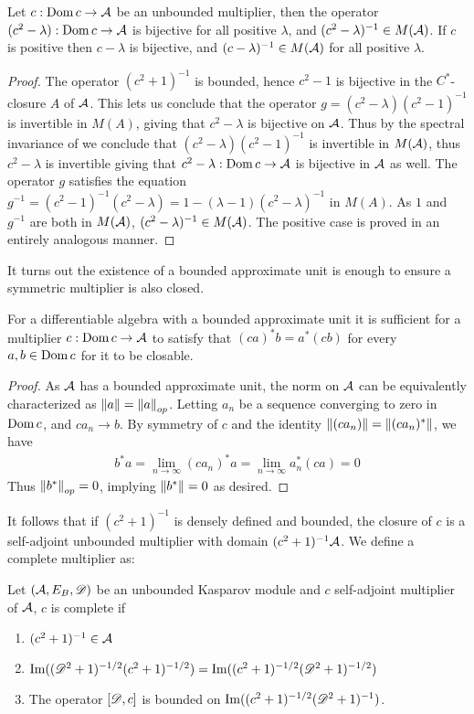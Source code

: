 \begin{lemma}
	Let $c:\operatorname{Dom} c\to \mathcal{A}$ be an unbounded multiplier, then the operator $(c^2-\lambda):\operatorname{Dom} c \to \mathcal{A}$ is bijective for all positive $\lambda$, and $(c^2-\lambda)^{-1}\in M(\mathcal{A})$. If $c$ is positive then $c-\lambda$ is bijective, and $(c-\lambda)^{-1}\in M(\mathcal{A})$ for all positive $\lambda$.
\end{lemma}
\begin{proof}
	The operator $(c^2+1)^{-1}$ is bounded, hence $c^2-1$ is bijective in the $C^*$-closure $A$ of $\mathcal{A}$. This lets us conclude that the operator $g=(c^2-\lambda)(c^2-1)^{-1}$ is invertible in $M(A)$, giving that $c^2-\lambda$ is bijective on $\mathcal{A}$. Thus by the spectral invariance of  we conclude that $(c^2-\lambda)(c^2-1)^{-1}$ is invertible in $M(\mathcal{A})$, thus $c^2-\lambda$ is invertible giving that $c^2-\lambda:\operatorname{Dom} c\to \mathcal{A}$ is bijective in $\mathcal{A}$ as well.
	The operator $g$ satisfies the equation $g^{-1}=(c^2-1)^{-1}(c^2-\lambda)=1-(\lambda -1)(c^2-\lambda)^{-1}$ in $M(A)$. As $1$ and $g^{-1}$ are both in $M(\mathcal{A})$, $(c^2-\lambda)^{-1}\in M(\mathcal{A})$. 
	The positive case is proved in an entirely analogous manner. 
\end{proof}
It turns out the existence of a bounded approximate unit is enough to ensure a symmetric multiplier is also closed. 
\begin{lemma}
	For a differentiable algebra with a bounded approximate unit it is sufficient for a multiplier $c:\operatorname{Dom} c \to \mathcal{A}$ to satisfy that $(ca)^*b=a^*(cb)$ for every $a,b\in \operatorname{Dom} c$ for it to be closable. 
\end{lemma}
\begin{proof}
	As $\mathcal{A}$ has a bounded approximate unit, the norm on $\mathcal{A}$ can be equivalently characterized as $\left \Vert a \right \Vert=\left \Vert a \right \Vert_{op}$. Letting $a_n$ be a sequence converging to zero in $\operatorname{Dom} c$, and $ca_n\to b$. By symmetry of $c$ and the identity $\left \Vert (ca_n) \right \Vert=\left \Vert (ca_n)^* \right \Vert$, we have 
	\begin{align*}
		b^*a=\lim_{n\to \infty} (ca_n)^* a=\lim_{n\to \infty} a^*_n(ca)=0
	\end{align*}
	Thus $\left \Vert b^* \right \Vert_{op}=0$, implying $\left \Vert b^* \right \Vert=0$ as desired. 
\end{proof}
It follows that if $(c^2+1)^{-1}$ is densely defined and bounded, the closure of $c$ is a self-adjoint unbounded multiplier with domain $(c^2+1)^{-1}\mathcal{A}$. We define a complete multiplier as: 
\begin{definition}
	Let $(\mathcal{A},E_B,\mathscr{D})$ be an unbounded Kasparov module and $c$ self-adjoint multiplier of $\mathcal{A}$, $c$ is complete if 
\begin{enumerate}
\item 
	$	(c^2+1)^{-1}\in \mathcal{A}$ 
\item
		$\operatorname{Im}((\mathscr{D}^2+1)^{-1/2}(c^2+1)^{-1/2})=\operatorname{Im}((c^2+1)^{-1/2}(\mathscr{D}^2+1)^{-1/2})$
\item 
		The operator $[\mathscr{D},c]$ is bounded on $\operatorname{Im}((c^2+1)^{-1/2}(\mathscr{D}^2+1)^{-1})$. 
\end{enumerate}
\end{definition}
